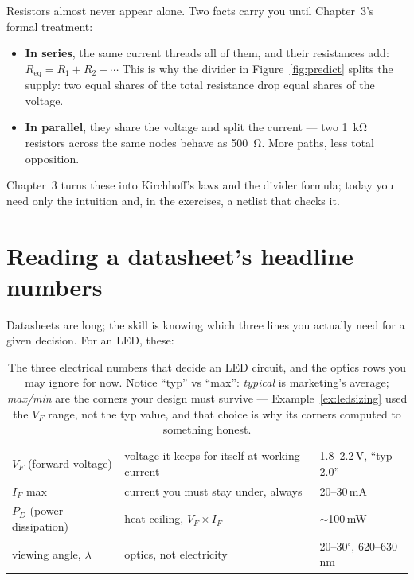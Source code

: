 Resistors almost never appear alone. Two facts carry you until Chapter~3's
formal treatment:
\begin{itemize}
\item \textbf{In series}, the same current threads all of them,
and their resistances add: $R_{\mathrm{eq}} = R_1 + R_2 + \cdots$ This is why
the divider in Figure~\ref{fig:predict} splits the supply: two equal shares
of the total resistance drop equal shares of the voltage.
\item \textbf{In parallel}, they share the voltage and split
the current — two \qty{1}{\kilo\ohm} resistors across the same nodes behave
as \qty{500}{\ohm}. More paths, less total opposition.
\end{itemize}
Chapter~3 turns these into Kirchhoff's laws and the divider formula; today
you need only the intuition and, in the exercises, a netlist that checks it.

\section{Reading a datasheet's headline numbers}
\label{sec:datasheet}

Datasheets are long; the skill is knowing which three lines you actually
need for a given decision. For an LED, these:

\begin{table}[htbp]
\centering\small
\begin{tabularx}{\linewidth}{lYl}
\toprule
{} &  & \\
\midrule
$V_F$ (forward voltage) & voltage it keeps for itself at working current & 1.8--2.2\,V, ``typ 2.0''\\
$I_F$ max & current you must stay under, always & 20--30\,mA\\
$P_D$ (power dissipation) & heat ceiling, $V_F \times I_F$ & $\sim$100\,mW\\
\midrule
viewing angle, $\lambda$ & optics, not electricity & 20--30$^\circ$, 620--630\,nm\\
\bottomrule
\end{tabularx}
\caption{The three electrical numbers that decide an LED circuit, and the
optics rows you may ignore for now. Notice ``typ'' vs ``max'': \emph{typical}
is marketing's average; \emph{max/min} are the corners your design must
survive — Example~\ref{ex:ledsizing} used the $V_F$ range, not the typ
value, and that choice is why its corners computed to something honest.}
\label{tab:datasheet}
\end{table}

